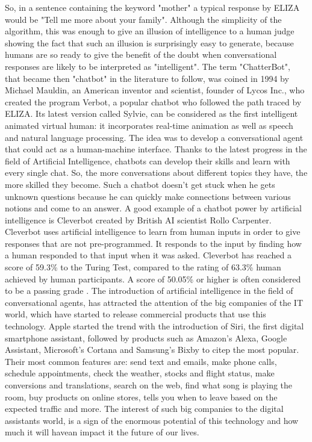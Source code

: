 \documentclass[b5paper,10pt,twoside,cucitura]{toptesi}
\begin{document}
So, in a sentence containing the keyword "mother" a typical response by ELIZA would be "Tell me more about your family". Although the simplicity of the algorithm, this was enough to give an illusion of intelligence to a human judge showing the fact that such an illusion is  surprisingly easy to generate, because humans are so ready to give the benefit of the doubt when conversational responses are likely to be interpreted as "intelligent".
The term "ChatterBot", that became then "chatbot" in the literature to follow, was coined in 1994 by Michael Mauldin, an American inventor and scientist, founder of Lycos Inc., who created the program Verbot, a popular chatbot who followed the path traced by ELIZA. Its latest version called Sylvie, can be considered as the first intelligent animated virtual human: it incorporates real-time animation as well as speech and natural language processing. The idea was to develop a conversational agent that could act as a human-machine interface. Thanks to the latest progress in the field of Artificial Intelligence, chatbots can develop their skills and learn with every single chat. So, the more conversations about different topics they have, the more skilled they become. Such a chatbot doesn't get stuck when he gets unknown questions because he can quickly make connections between various notions and come to an answer. A good example of a chatbot power by artificial intelligence is Cleverbot  \citep{cleverbot} created by British AI scientist Rollo Carpenter. Cleverbot uses artificial intelligence to learn from human inputs in order to give responses that are not pre-programmed. It responds to the input by finding how a human responded to that input when it was asked. Cleverbot has reached a score of 59.3\% to the Turing Test, compared to the rating of 63.3\% human achieved by human participants. A score of 50.05\% or higher is often considered to be a passing grade  \citep{jacob}. The introduction of artificial intelligence in the field of conversational agents, has attracted the attention of the big companies of the IT world, which have started to release commercial products that use this technology. Apple started the trend with the introduction of Siri, the first digital smartphone assistant, followed by products such as Amazon's Alexa, Google Assistant, Microsoft's Cortana and Samsung's Bixby to citep the most popular. Their most common features are: send text and emails, make phone calls, schedule appointments, check the weather, stocks and flight status, make conversions and translations, search on the web, find what song is playing the room, buy products on online stores, tells you when to leave based on the expected traffic and more. The interest of such big companies to the digital assistants world, is a sign of the enormous potential of this technology and how much it will havean impact it the future of our lives. 
\end{document}
